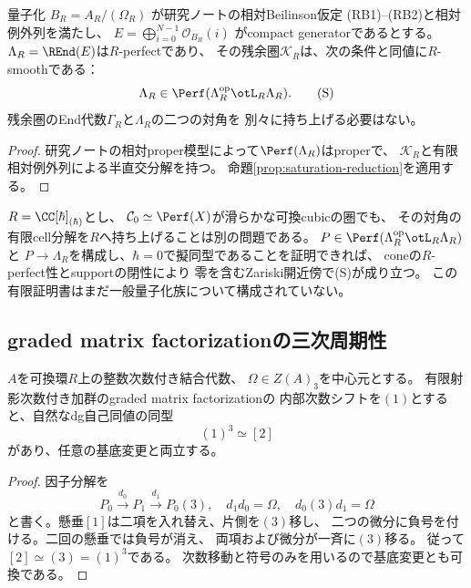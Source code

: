 \begin{corollary}[必要な対角証明書は一つでよい]
\label{cor:only-ambient-diagonal}
量子化 $B_R=A_R/(\Omega_R)$ が研究ノートの相対Beilinson仮定
(RB1)--(RB2)と相対例外列を満たし、
$E=\bigoplus_{i=0}^{N-1}\mathcal O_{B_R}(i)$ がcompact generatorであるとする。
$\Lambda_R=\REnd(E)$は$R$-perfectであり、
その残余圏$\mathcal K_R$は、次の条件と同値に$R$-smoothである：
\[
\Lambda_R\in
\Perf(\Lambda_R^{\mathrm{op}}\otL_R\Lambda_R).
\tag{S}
\]
残余圏のEnd代数$\Gamma_R$と$\Lambda_R$の二つの対角を
別々に持ち上げる必要はない。
\end{corollary}
\begin{proof}
研究ノートの相対proper模型によって$\Perf(\Lambda_R)$はproperで、
$\mathcal K_R$と有限相対例外列による半直交分解を持つ。
命題\ref{prop:saturation-reduction}を適用する。
\end{proof}

\begin{remark}[閉ファイバーのsmoothnessだけでは足りない]
$R=\CC[\hbar]_{(\hbar)}$とし、
$\mathcal C_0\simeq\Perf(X)$が滑らかな可換cubicの圏でも、
その対角の有限cell分解を$R$へ持ち上げることは別の問題である。
$P\in\Perf(\Lambda_R^{\mathrm{op}}\otL_R\Lambda_R)$と
$P\to\Lambda_R$を構成し、$\hbar=0$で擬同型であることを証明できれば、
coneの$R$-perfect性とsupportの閉性により
零を含むZariski開近傍で(S)が成り立つ。
この有限証明書はまだ一般量子化族について構成されていない。
\end{remark}

\subsection{graded matrix factorizationの三次周期性}
\begin{lemma}[中心三次元の形式的周期性]
\label{lem:mf-three-period}
$A$を可換環$R$上の整数次数付き結合代数、
$\Omega\in Z(A)_3$を中心元とする。
有限射影次数付き加群のgraded matrix factorizationの
内部次数シフトを$(1)$とすると、自然なdg自己同値の同型
\[
(1)^3\simeq[2]
\]
があり、任意の基底変更と両立する。
\end{lemma}
\begin{proof}
因子分解を
\[
P_0\xrightarrow{d_0}P_1\xrightarrow{d_1}P_0(3),
\quad
d_1d_0=\Omega,\quad d_0(3)d_1=\Omega
\]
と書く。懸垂$[1]$は二項を入れ替え、片側を$(3)$移し、
二つの微分に負号を付ける。二回の懸垂では負号が消え、
両項および微分が一斉に$(3)$移る。
従って$[2]\simeq(3)=(1)^3$である。
次数移動と符号のみを用いるので基底変更とも可換である。
\end{proof}

